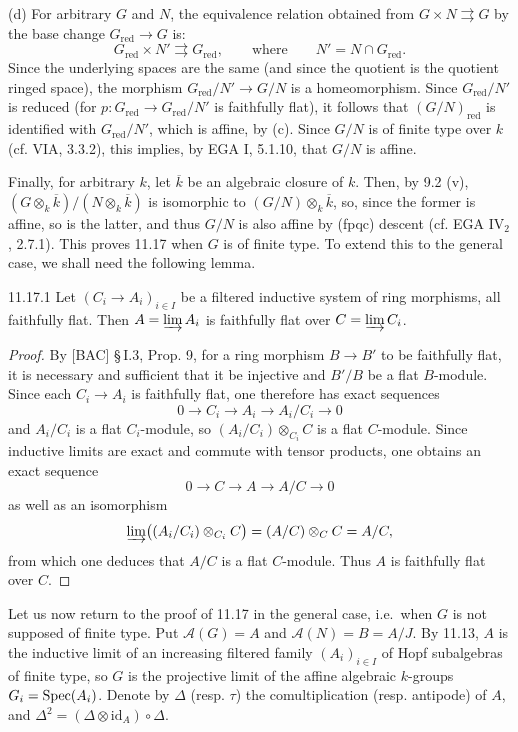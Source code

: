 (d) For arbitrary $G$ and $N$, the equivalence relation obtained from $G\times N\rightrightarrows G$ by the base change $G_{\mathrm{red}}\to G$ is:
\[
G_{\mathrm{red}}\times N'\rightrightarrows G_{\mathrm{red}},\qquad\text{where}\qquad N'=N\cap G_{\mathrm{red}}.
\]
Since the underlying spaces are the same (and since the quotient is the quotient ringed space), the morphism $G_{\mathrm{red}}/N'\to G/N$ is a homeomorphism. Since $G_{\mathrm{red}}/N'$ is reduced (for $p:G_{\mathrm{red}}\to G_{\mathrm{red}}/N'$ is faithfully flat), it follows that $(G/N)_{\mathrm{red}}$ is identified with $G_{\mathrm{red}}/N'$, which is affine, by (c). Since $G/N$ is of finite type over $k$ (cf. VIA, 3.3.2), this implies, by EGA I, 5.1.10, that $G/N$ is affine.

Finally, for arbitrary $k$, let $\overline k$ be an algebraic closure of $k$. Then, by 9.2 (v), $(G\otimes_k\overline k)/(N\otimes_k\overline k)$ is isomorphic to $(G/N)\otimes_k\overline k$, so, since the former is affine, so is the latter, and thus $G/N$ is also affine by (fpqc) descent (cf. EGA IV$_2$, 2.7.1). This proves 11.17 when $G$ is of finite type. To extend this to the general case, we shall need the following lemma.

\begin{lemma}{11.17.1}\label{VIB.11.17.1}
Let $(C_i\to A_i)_{i\in I}$ be a filtered inductive system of ring morphisms, all faithfully flat. Then $A=\varinjlim A_i$ is faithfully flat over $C=\varinjlim C_i$.
\end{lemma}
\begin{proof}
By [BAC] \S\,I.3, Prop. 9, for a ring morphism $B\to B'$ to be faithfully flat, it is necessary and sufficient that it be injective and $B'/B$ be a flat $B$-module. Since each $C_i\to A_i$ is faithfully flat, one therefore has exact sequences
\[
0\to C_i\to A_i\to A_i/C_i\to0
\]
and $A_i/C_i$ is a flat $C_i$-module, so $(A_i/C_i)\otimes_{C_i}C$ is a flat $C$-module. Since inductive limits are exact and commute with tensor products, one obtains an exact sequence
\[
0\to C\to A\to A/C\to0
\]
as well as an isomorphism
\[
\varinjlim\bigl((A_i/C_i)\otimes_{C_i}C\bigr)=(A/C)\otimes_C C=A/C,
\]
from which one deduces that $A/C$ is a flat $C$-module. Thus $A$ is faithfully flat over $C$.
\end{proof}
Let us now return to the proof of 11.17 in the general case, i.e.\ when $G$ is not supposed of finite type. Put $\mathscr A(G)=A$ and $\mathscr A(N)=B=A/J$. By 11.13, $A$ is the inductive limit of an increasing filtered family $(A_i)_{i\in I}$ of Hopf subalgebras of finite type, so $G$ is the projective limit of the affine algebraic $k$-groups $G_i=\operatorname{Spec}(A_i)$. Denote by $\Delta$ (resp. $\tau$) the comultiplication (resp. antipode) of $A$, and $\Delta^2=(\Delta\otimes\mathrm{id}_A)\circ\Delta$.

